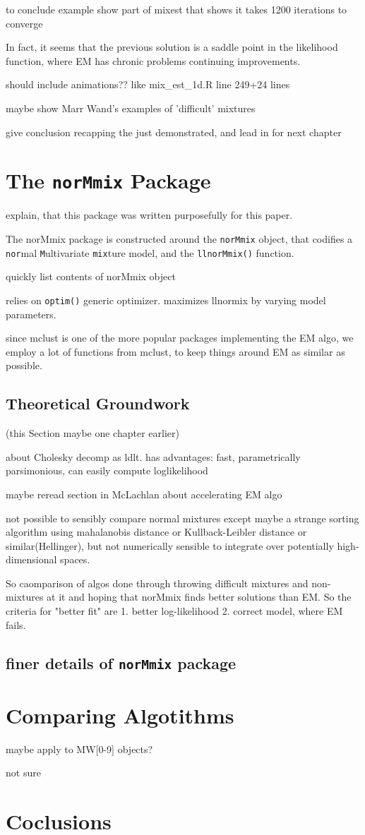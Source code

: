 to conclude example show part of mixest that shows it takes 1200 iterations to converge

In fact, it seems that the previous solution is a saddle point in the likelihood function, where EM has chronic problems continuing improvements.

should include animations?? like mix\_est\_1d.R line 249+24 lines

maybe show Marr Wand's examples of 'difficult' mixtures

give conclusion recapping the just demonstrated, and lead in for next chapter






\chapter{The {\tt norMmix} Package}

explain, that this package was written purposefully for this paper.

The norMmix package is constructed around the {\tt norMmix} object, that codifies a {\tt nor}mal {\tt M}ultivariate {\tt mix}ture model,  and the {\tt llnorMmix()} function.

quickly list contents of norMmix object

relies on {\tt optim()} generic optimizer. maximizes llnormix by varying model parameters.

since mclust is one of the more popular packages implementing the EM algo, we employ a lot of functions from mclust, to keep things around EM as similar as possible.

\section{Theoretical Groundwork} (this Section maybe one chapter earlier)

about Cholesky decomp as ldlt. has advantages: fast, parametrically parsimonious, can easily compute loglikelihood

maybe reread section in McLachlan about accelerating EM algo

not possible to sensibly compare normal mixtures except maybe a strange sorting algorithm using mahalanobis distance or Kullback-Leibler distance or similar(Hellinger), but not numerically sensible to integrate over potentially high-dimensional spaces.

So caomparison of algos done through throwing difficult mixtures and non-mixtures at it and hoping that norMmix finds better solutions than EM. So the criteria for "better fit" are 1. better log-likelihood 2. correct model, where EM fails.

\section{finer details of {\tt norMmix} package}




\chapter{Comparing Algotithms}


maybe apply to MW[0-9] objects?

not sure


\chapter{Coclusions}
